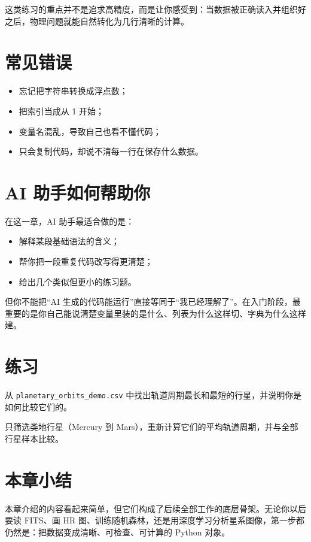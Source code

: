 这类练习的重点并不是追求高精度，而是让你感受到：当数据被正确读入并组织好之后，物理问题就能自然转化为几行清晰的计算。

\section{常见错误}

\begin{warnbox}[入门阶段最容易出现的问题]
\begin{itemize}
    \item 忘记把字符串转换成浮点数；
    \item 把索引当成从 1 开始；
    \item 变量名混乱，导致自己也看不懂代码；
    \item 只会复制代码，却说不清每一行在保存什么数据。
\end{itemize}
\end{warnbox}

\section{AI 助手如何帮助你}

在这一章，AI 助手最适合做的是：

\begin{itemize}
    \item 解释某段基础语法的含义；
    \item 帮你把一段重复代码改写得更清楚；
    \item 给出几个类似但更小的练习题。
\end{itemize}

但你不能把“AI 生成的代码能运行”直接等同于“我已经理解了”。在入门阶段，最重要的是你自己能说清楚变量里装的是什么、列表为什么这样切、字典为什么这样建。

\section{练习}

\begin{exercisebox}[基础练习]
从 \texttt{planetary\_orbits\_demo.csv} 中找出轨道周期最长和最短的行星，并说明你是如何比较它们的。
\end{exercisebox}

\begin{exercisebox}[进阶练习]
只筛选类地行星（Mercury 到 Mars），重新计算它们的平均轨道周期，并与全部行星样本比较。
\end{exercisebox}

\section{本章小结}

本章介绍的内容看起来简单，但它们构成了后续全部工作的底层骨架。无论你以后要读 FITS、画 HR 图、训练随机森林，还是用深度学习分析星系图像，第一步都仍然是：把数据变成清晰、可检查、可计算的 Python 对象。
